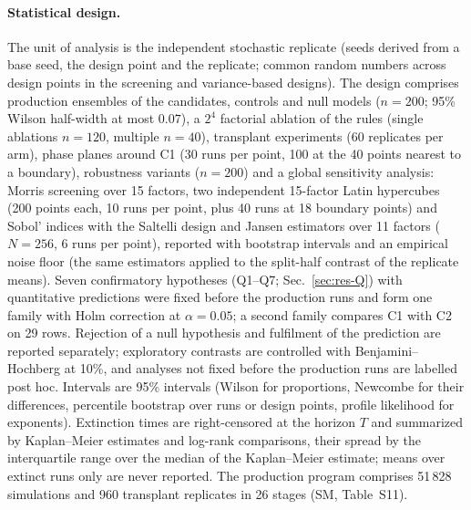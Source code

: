 \paragraph{Statistical design.}
The unit of analysis is the independent stochastic replicate (seeds derived from a base seed, the design point and
the replicate; common random numbers across design points in the screening and variance-based designs). The design
comprises production ensembles of the candidates, controls and null models ($n=200$; 95\% Wilson half-width at most
$0.07$), a $2^4$ factorial ablation of the rules (single ablations $n=120$, multiple $n=40$), transplant experiments
(60 replicates per arm), phase planes around \textsf{C1} (30 runs per point, 100 at the 40 points nearest to a
boundary), robustness variants ($n=200$) and a global sensitivity analysis: Morris screening over 15 factors, two
independent 15-factor Latin hypercubes (200 points each, 10 runs per point, plus 40 runs at 18 boundary points) and
Sobol' indices with the Saltelli design and Jansen estimators \cite{Saltelli2010} over 11 factors ($N=256$, 6
runs per point), reported with bootstrap intervals and an empirical noise floor (the same estimators applied to
the split-half contrast of the replicate means). Seven confirmatory hypotheses (Q1--Q7; Sec.~\ref{sec:res-Q}) with
quantitative predictions were fixed before the production runs and form one family with Holm correction
\cite{Holm1979} at $\alpha=0.05$; a second family compares \textsf{C1} with \textsf{C2} on 29 rows. Rejection of
a null hypothesis and fulfilment of the prediction are reported separately; exploratory contrasts are controlled
with Benjamini--Hochberg at 10\%, and analyses not fixed before the production runs are labelled post hoc. Intervals are 95\%
intervals (Wilson for proportions, Newcombe for their differences, percentile bootstrap over runs or design
points, profile likelihood for exponents). Extinction times are right-censored at the horizon $T$ and summarized
by Kaplan--Meier estimates and log-rank comparisons, their spread by the interquartile range over the median of
the Kaplan--Meier estimate; means over extinct runs only are never reported. The production program comprises 51\,828
simulations and 960 transplant replicates in 26 stages (SM, Table~S11).
